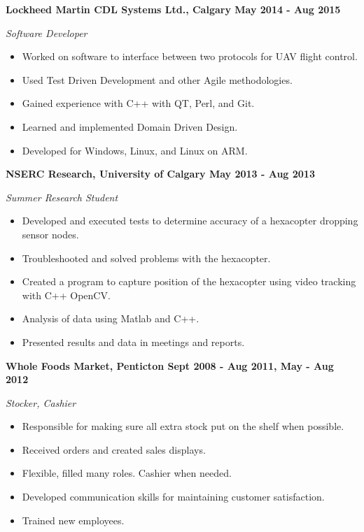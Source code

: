 \documentclass[12pt]{article}
\begin{document}
\noindent \centerline{ \bf Lockheed Martin CDL Systems Ltd., Calgary \hfill May 2014 - Aug 2015}
\indent \emph{ Software Developer }
\begin{itemize}
  \item Worked on software to interface between two protocols for UAV flight control.
  \item Used Test Driven Development and other Agile methodologies.
  \item Gained experience with C++ with QT, Perl, and Git.
  \item Learned and implemented Domain Driven Design.
  \item Developed for Windows, Linux, and Linux on ARM.
\end{itemize}

\noindent \centerline{ \bf NSERC Research, University of Calgary \hfill May 2013 - Aug 2013}
\indent \emph{ Summer Research Student }
\begin{itemize}
  \item Developed and executed tests to determine accuracy of a hexacopter dropping sensor nodes.
  \item Troubleshooted and solved problems with the hexacopter.
  \item Created a program to capture position of the hexacopter using video tracking with C++ OpenCV.
  \item Analysis of data using Matlab and C++.
  \item Presented results and data in meetings and reports.
\end{itemize}

\noindent \centerline{ \bf Whole Foods Market, Penticton \hfill Sept 2008 - Aug 2011, May - Aug 2012}
\indent \emph{Stocker, Cashier}
\begin{itemize}
  \item Responsible for making sure all extra stock put on the shelf when possible.
  \item Received orders and created sales displays.
  \item Flexible, filled many roles. Cashier when needed.
  \item Developed communication skills for maintaining customer satisfaction.
  \item Trained new employees.
\end{itemize}

\bigskip
{}
\bigskip
\end{document}
